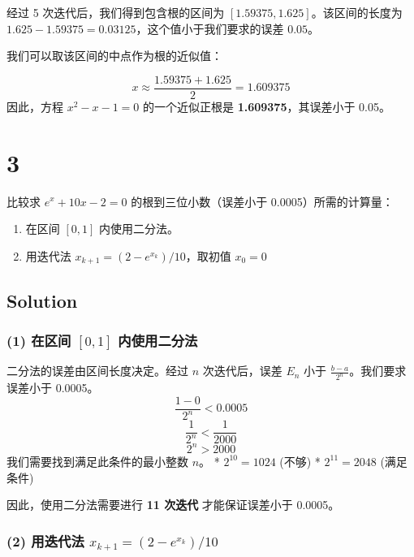 \documentclass[11pt]{article}
\begin{document}
经过 5 次迭代后，我们得到包含根的区间为
\([1.59375, 1.625]\)。该区间的长度为
\(1.625 - 1.59375 = 0.03125\)，这个值小于我们要求的误差 \(0.05\)。

我们可以取该区间的中点作为根的近似值：

\[
x \approx \frac{1.59375 + 1.625}{2} = 1.609375
\] 因此，方程 \(x^2 - x - 1 = 0\) 的一个近似正根是
\textbf{1.609375}，其误差小于 0.05。

    \section{3}\label{section}

比较求 \(e^x + 10x - 2 = 0\) 的根到三位小数（误差小于
0.0005）所需的计算量：

\begin{enumerate}
\def\labelenumi{(\arabic{enumi})}
\item
  在区间 \([0, 1]\) 内使用二分法。
\item
  用迭代法 \(x_{k + 1} = (2 - e^{x_k})/10\)，取初值 \(x_0 = 0\)
\end{enumerate}

\subsection{Solution}\label{solution}

\subsubsection{\texorpdfstring{(1) 在区间 \([0, 1]\)
内使用二分法}{(1) 在区间 {[}0, 1{]} 内使用二分法}}\label{ux5728ux533aux95f4-0-1-ux5185ux4f7fux7528ux4e8cux5206ux6cd5}

二分法的误差由区间长度决定。经过 \(n\) 次迭代后，误差 \(E_n\) 小于
\(\frac{b - a}{2^n}\)。我们要求误差小于 0.0005。 \[
\frac{1 - 0}{2^n} < 0.0005
\] \[
\frac{1}{2^n} < \frac{1}{2000}
\] \[
2^n > 2000
\] 我们需要找到满足此条件的最小整数 \(n\)。 * \(2^{10} = 1024\) (不够) *
\(2^{11} = 2048\) (满足条件)

因此，使用二分法需要进行 \textbf{11 次迭代} 才能保证误差小于 0.0005。

\subsubsection{\texorpdfstring{(2) 用迭代法
\(x_{k + 1} = (2 - e^{x_k})/10\)}{(2) 用迭代法 x\_\{k + 1\} = (2 - e\^{}\{x\_k\})/10}}\label{ux7528ux8fedux4ee3ux6cd5-x_k-1-2---ex_k10}
\end{document}
